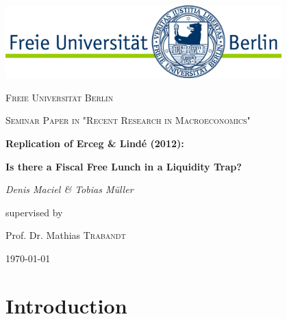 \documentclass[12pt,a4paper,oneside,titlepage]{article}
\begin{document}
\parindent 0pt %
\begin{titlepage}
	\centering
	\includegraphics[width=0.8\textwidth]{pictures/LogoFU}\par\vspace{1cm}
	{\scshape\large Freie Universität Berlin \par}
	\vspace{1cm}
	{\scshape\large Seminar Paper in "Recent Research in Macroeconomics"\par}
	\vspace{1.5cm}
	{\LARGE\bfseries Replication of Erceg \& Lindé (2012):\par}
	\vspace{0.5cm}
	{\Large\bfseries Is there a Fiscal Free Lunch in a Liquidity Trap?\par}
	\vspace{2cm}
	{\Large\itshape Denis Maciel \& Tobias Müller\par}
	\vfill
	supervised by\par
	Prof. Dr. Mathias \textsc{Trabandt}

	\vfill

	{\large \today\par}
\end{titlepage}


\doublespacing
\tableofcontents

\pagebreak[4]
\listoffigures
\listoftables
\newpage

\section{Introduction}
\end{document}
